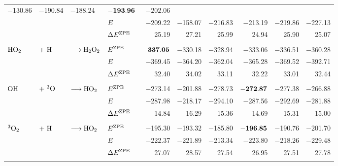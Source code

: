 \begin{table}[t!]
\begin{adjustbox}{width=1.0\textwidth,center}
\begin{tabular}{lll|lDDDDD|r}
    $-$130.86 & $-$190.84 & $-$188.24 & $\mathbf{-193.96}$ & $-202.06$ \\
      & & & $E$   & $-$209.22 & $-$158.07 & $-$216.83 & $-$213.19 & $-$219.86 & $-$227.13 \\
      & & & $\Delta{E}^{\text{ZPE}}$ & 25.19 & 27.21 & 25.99 & 24.94 & 25.90 & 25.07 \\[2pt]
    \hline
       & & & & & & & & &  \\[-10pt]
    $\text H \text O_2$&$+\ \te{H}$&$\longrightarrow\text H _2 \text O_2$ &
    $E^{\text{ZPE}}$ & $\mathbf{-337.05}$ & $-$330.18 & $-$328.94 & $-$333.06 & $-$336.51
    & $-$360.28 \\
      & & & $E$   & $-$369.45 & $-$364.20 & $-$362.04 & $-$365.28 & $-$369.52 & $-$392.71 \\
      & & & $\Delta{E}^{\text{ZPE}}$ & 32.40 & 34.02 & 33.11 & 32.22 & 33.01 & 32.44 \\[2pt]
    \hline
       & & & & & & & & &  \\[-10pt]
    $\text O \text H$&$+\ \tripo$&$\longrightarrow\text H \text O_2$ & $E^{\text{ZPE}}$ & $-$273.14 &
    $-$201.88 & $-$278.73 & $\mathbf{-272.87}$ & $-$277.38 & $-$266.88 \\
      & & & $E$   & $-$287.98 & $-$218.17 & $-$294.10 & $-$287.56 & $-$292.69 & $-$281.88 \\
      & & & $\Delta{E}^{\text{ZPE}}$ & 14.84 & 16.29 & 15.36 & 14.69 & 15.31 & 15.00 \\[2pt]
    \hline
       & & & & & & & & &  \\[-10pt]
    ${^3\text O_2}$&$+\ \te{H}$&$\longrightarrow\text H \text O_2$ & $E^{\text{ZPE}}$ & $-$195.30 &
    $-$193.32 & $-$185.80 & $-\mathbf{196.85}$ & $-$190.76 & $-$201.70 \\
      & & & $E$   & $-$222.37 & $-$221.89 & $-$213.34 & $-$223.80 & $-$218.26 & $-$229.48 \\
      & & & $\Delta{E}^{\text{ZPE}}$ & 27.07 & 28.57 & 27.54 & 26.95 & 27.51 & 27.78 \\[2pt]
     \hline \hline
      & & & & & & & & &  \\[-10pt]

\end{tabular}
\end{adjustbox}
\end{table}
